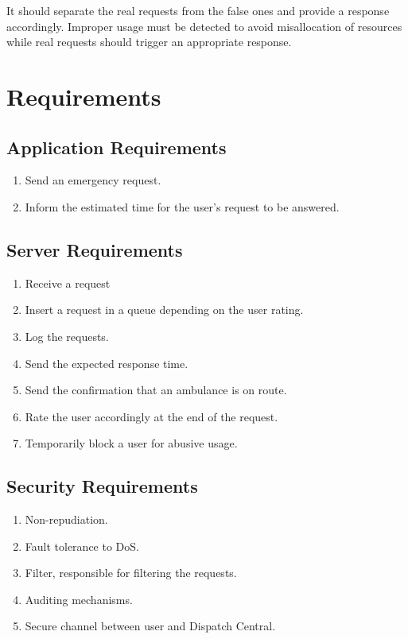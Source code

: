 \documentclass[a4paper,titlepage,11pt]{article}
\begin{document}
It should separate the real requests from the false ones and provide a response accordingly.
Improper usage must be detected to avoid misallocation of resources while real requests should
trigger an appropriate response.

\section{Requirements}

\subsection{Application Requirements}
\begin{enumerate}
  \item Send an emergency request.
  \item Inform the estimated time for the user's request to be answered.
\end{enumerate}

\subsection{Server Requirements}
\begin{enumerate}
  \item Receive a request
  \item Insert a request in a queue depending on the user rating.
  \item Log the requests.
  \item Send the expected response time.
  \item Send the confirmation that an ambulance is on route.
  \item Rate the user accordingly at the end of the request.
  \item Temporarily block a user for abusive usage.
\end{enumerate}

\subsection{Security Requirements}
\begin{enumerate}
  \item Non-repudiation.
  \item Fault tolerance to DoS.
  \item Filter, responsible for filtering the requests.
  \item Auditing mechanisms.
  \item Secure channel between user and Dispatch Central.
\end{enumerate}
\end{document}
